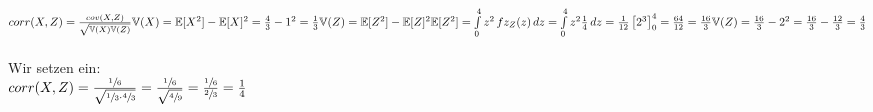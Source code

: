 \documentclass[a4paper]{article}
\begin{document}
\(corr(X,Z)=\frac{cov(X,Z)}{\sqrt{\mathbb{V}(X)\mathbb{V}(Z)}}\\\mathbb{V}(X)=\mathbb{E}[X^2]-\mathbb{E}[X]^2 = \frac{4}{3}-1^2=\frac{1}{3}\\\\
\mathbb{V}(Z)=\mathbb{E}[Z^2]-\mathbb{E}[Z]^2\\
\mathbb{E}[Z^2]=\int\limits^4_0 z^2\, fz_Z(z)\, dz=\int\limits^4_0z^2\frac{1}{4}\, dz = \frac{1}{12} \left[2^3\right]^4_0=\frac{64}{12}=\frac{16}{3}\\
\mathbb{V}(Z)=\frac{16}{3}-2^2=\frac{16}{3}-\frac{12}{3}=\frac{4}{3}\)\\\\
Wir setzen ein:\\
\(corr(X,Z)=\frac{\sfrac{1}{6}}{\sqrt{\sfrac{1}{3}\cdot \sfrac{4}{3}}}=\frac{\sfrac{1}{6}}{\sqrt{\sfrac{4}{9}}}=\frac{\sfrac{1}{6}}{\sfrac{2}{3}}=\frac{1}{4}\)
\end{document}
